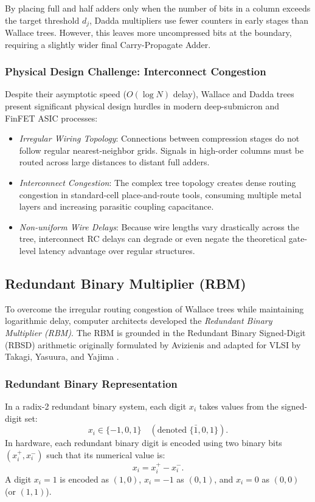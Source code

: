 By placing full and half adders only when the number of bits in a column exceeds the target threshold $d_j$, Dadda multipliers use fewer counters in early stages than Wallace trees. However, this leaves more uncompressed bits at the boundary, requiring a slightly wider final Carry-Propagate Adder.

\subsubsection{Physical Design Challenge: Interconnect Congestion}
Despite their asymptotic speed ($O(\log N)$ delay), Wallace and Dadda trees present significant physical design hurdles in modern deep-submicron and FinFET ASIC processes:
\begin{itemize}
    \item \textit{Irregular Wiring Topology}: Connections between compression stages do not follow regular nearest-neighbor grids. Signals in high-order columns must be routed across large distances to distant full adders.
    \item \textit{Interconnect Congestion}: The complex tree topology creates dense routing congestion in standard-cell place-and-route tools, consuming multiple metal layers and increasing parasitic coupling capacitance.
    \item \textit{Non-uniform Wire Delays}: Because wire lengths vary drastically across the tree, interconnect RC delays can degrade or even negate the theoretical gate-level latency advantage over regular structures.
\end{itemize}

\subsection{Redundant Binary Multiplier (RBM)}

To overcome the irregular routing congestion of Wallace trees while maintaining logarithmic delay, computer architects developed the \textit{Redundant Binary Multiplier (RBM)}. The RBM is grounded in the Redundant Binary Signed-Digit (RBSD) arithmetic originally formulated by Avizienis \cite{avizienis1961} and adapted for VLSI by Takagi, Yasuura, and Yajima \cite{takagi1985}.

\subsubsection{Redundant Binary Representation}
In a radix-2 redundant binary system, each digit $x_i$ takes values from the signed-digit set:
\begin{equation}
x_i \in \{-1, 0, 1\} \quad (\text{denoted } \{\bar{1}, 0, 1\}).
\end{equation}
In hardware, each redundant binary digit is encoded using two binary bits $(x_i^+, x_i^-)$ such that its numerical value is:
\begin{equation}
x_i = x_i^+ - x_i^-.
\end{equation}
A digit $x_i = 1$ is encoded as $(1, 0)$, $x_i = -1$ as $(0, 1)$, and $x_i = 0$ as $(0, 0)$ (or $(1, 1)$).


